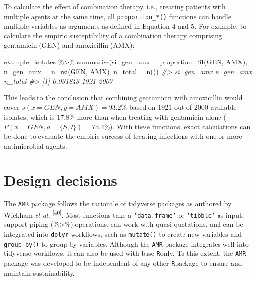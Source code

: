 \documentclass[
]{book}
\newenvironment{Shaded}{\begin{snugshade}}{\end{snugshade}}
\newcommand{\AttributeTok}[1]{\textcolor[rgb]{0.77,0.63,0.00}{#1}}
\newcommand{\CommentTok}[1]{\textcolor[rgb]{0.56,0.35,0.01}{\textit{#1}}}
\newcommand{\FunctionTok}[1]{\textcolor[rgb]{0.00,0.00,0.00}{#1}}
\newcommand{\NormalTok}[1]{#1}
\newcommand{\SpecialCharTok}[1]{\textcolor[rgb]{0.00,0.00,0.00}{#1}}
\begin{document}
To calculate the effect of combination therapy, i.e., treating patients with multiple agents at the same time, all \texttt{proportion\_*()} functions can handle multiple variables as arguments as defined in Equation 4 and 5. For example, to calculate the empiric susceptibility of a combination therapy comprising gentamicin (GEN) and amoxicillin (AMX):

\begin{Shaded}
\begin{Highlighting}[]
\NormalTok{example\_isolates }\SpecialCharTok{\%\textgreater{}\%}
  \FunctionTok{summarise}\NormalTok{(}\AttributeTok{si\_gen\_amx =} \FunctionTok{proportion\_SI}\NormalTok{(GEN, AMX),}
            \AttributeTok{n\_gen\_amx =} \FunctionTok{n\_rsi}\NormalTok{(GEN, AMX),}
            \AttributeTok{n\_total =} \FunctionTok{n}\NormalTok{())}
\CommentTok{\#\textgreater{}     si\_gen\_amx n\_gen\_amx n\_total}
\CommentTok{\#\textgreater{} [1]   0.931843      1921    2000}
\end{Highlighting}
\end{Shaded}

This leads to the conclusion that combining gentamicin with amoxicillin would cover \(s{(x = GEN, y = AMX)} = 93.2\%\) based on \(1921\) out of \(2000\) available isolates, which is \(17.8\%\) more than when treating with gentamicin alone (\(P{(x = GEN, o = \{S,I\})} = 75.4\%\)). With these functions, exact calculations can be done to evaluate the empiric success of treating infections with one or more antimicrobial agents.

\hypertarget{design-decisions}{%
\section{Design decisions}\label{design-decisions}}

The \texttt{AMR} package follows the rationale of tidyverse packages as authored by Wickham \emph{et al.} \textsuperscript{{[}40{]}}. Most functions take a \texttt{‘data.frame’} or \texttt{‘tibble’} as input, support piping (\%\textgreater\%) operations, can work with quasi-quotations, and can be integrated into \texttt{dplyr} workflows, such as \texttt{mutate()} to create new variables and \texttt{group\_by()} to group by variables. Although the \texttt{AMR} package integrates well into tidyverse workflows, it can also be used with base \texttt{R}only. To this extent, the \texttt{AMR} package was developed to be independent of any other \texttt{R}package to ensure and maintain sustainability.
\end{document}
